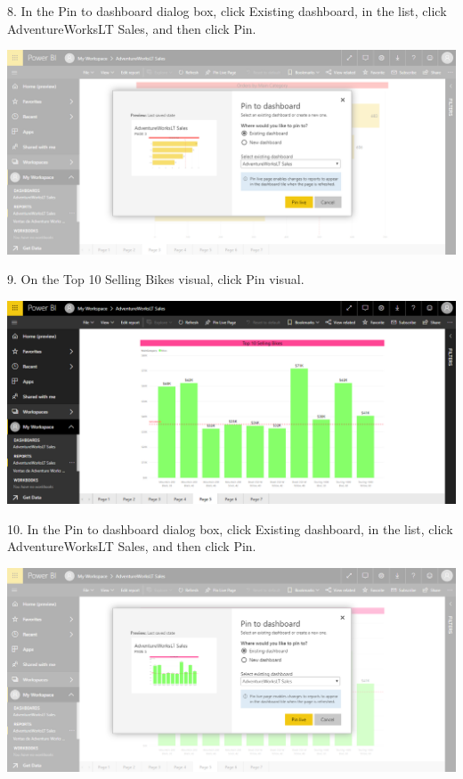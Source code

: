 8. In the Pin to dashboard dialog box, click Existing dashboard, in the list, click AdventureWorksLT
Sales, and then click Pin.\\

	\begin{center}
	\includegraphics[width=17cm]{./Imagenes/Ejercicio3/Tarea2/6}
	\end{center}	

9. On the Top 10 Selling Bikes visual, click Pin visual.\\

	\begin{center}
	\includegraphics[width=17cm]{./Imagenes/Ejercicio3/Tarea2/7}
	\end{center}	

10. In the Pin to dashboard dialog box, click Existing dashboard, in the list, click AdventureWorksLT
Sales, and then click Pin.\\

	\begin{center}
	\includegraphics[width=17cm]{./Imagenes/Ejercicio3/Tarea2/8}
	\end{center}	

